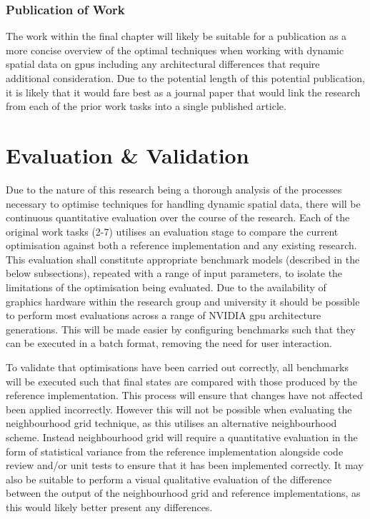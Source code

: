       \subsubsection*{Publication of Work}
        The work within the final chapter will likely be suitable for a publication as a more concise overview of the optimal techniques when working with dynamic spatial data on \glspl{gpu} including any architectural differences that require additional consideration. 
        Due to the potential length of this potential publication, it is likely that it would fare best as a journal paper that would link the research from each of the prior work tasks into a single published article.
      
  \section{Evaluation \& Validation\label{sec:eval-validation}}
    Due to the nature of this research being a thorough analysis of the processes necessary to optimise techniques for handling dynamic spatial data, there will be continuous quantitative evaluation over the course of the research. Each of the original work tasks (2-7) utilises an evaluation stage to compare the current optimisation against both a reference implementation and any existing research. This evaluation shall constitute appropriate benchmark models (described in the below subsections), repeated with a range of input parameters, to isolate the limitations of the optimisation being evaluated. Due to the availability of graphics hardware within the research group and university it should be possible to perform most evaluations across a range of NVIDIA \gls{gpu} architecture generations. This will be made easier by configuring benchmarks such that they can be executed in a batch format, removing the need for user interaction.
    
    To validate that optimisations have been carried out correctly, all benchmarks will be executed such that final states are compared with those produced by the reference implementation. This process will ensure that changes have not affected been applied incorrectly. However this will not be possible when evaluating the neighbourhood grid technique, as this utilises an alternative neighbourhood scheme. Instead neighbourhood grid will require a quantitative evaluation in the form of statistical variance from the reference implementation alongside code review and/or unit tests to ensure that it has been implemented correctly. It may also be suitable to perform a visual qualitative evaluation of the difference between the output of the neighbourhood grid and reference implementations, as this would likely better present any differences.
    
